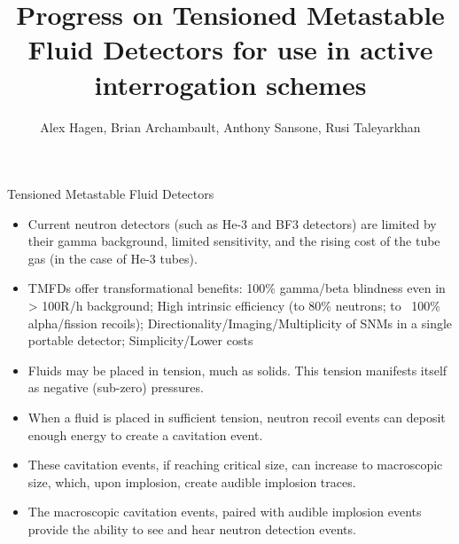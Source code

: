 \documentclass{puposter}
\begin{document}
\title{Progress on Tensioned Metastable Fluid Detectors for use in active
       interrogation schemes}
\author{Alex Hagen, Brian Archambault,
        Anthony Sansone, Rusi Taleyarkhan}
\renewcommand{\today}{July 3, 2016}
\maketitle%
\hspace*{-1cm}%
\begin{pucol}{7}{12}
\def\numheadings{2}
\begin{pucell}{7}{6}{Tensioned Metastable Fluid Detectors}{}
    \begin{pucol}{4}{6}
    \begin{pucell}{4}{3}{}{}
        \begin{itemize}
            \item Current neutron detectors (such as He-3 and BF3 detectors) are limited by their gamma background, limited sensitivity, and the rising cost of the tube gas (in the case of He-3 tubes).
            \item TMFDs offer transformational benefits: 100\% gamma/beta blindness even in > 100R/h background; High intrinsic efficiency  (to 80\% neutrons; to ~100\% alpha/fission recoils); Directionality/Imaging/Multiplicity of SNMs in  a single portable detector; Simplicity/Lower costs
            \item Fluids may be placed in tension, much as solids. This tension manifests itself as negative (sub-zero) pressures.
            \item When a fluid is placed in sufficient tension, neutron recoil events can deposit enough energy to create a cavitation event.
            \item These cavitation events, if reaching critical size, can increase to macroscopic size, which, upon implosion, create audible implosion traces.
            \item The macroscopic cavitation events, paired with audible implosion events provide the ability to see and hear neutron detection events.
        \end{itemize}
    \end{pucell} \\
    \vspace*{-2.25in}
    \begin{pucell}{4}{3}{}{}

\end{pucell}
\end{pucol}
\end{pucell}
\end{pucol}
\end{document}
